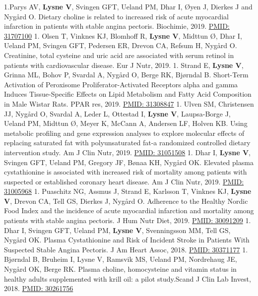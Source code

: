 \documentclass[11pt, a4paper]{awesome-cv}
\begin{document}
1.Parys AV, \textbf{Lysne V}, Svingen GFT, Ueland PM, Dhar I, Øyen J, Dierkes J and Nygård O. Dietary choline is related to increased risk of acute myocardial infarction in patients with stable angina pectoris. Biochimie, 2019. \href{https://www.ncbi.nlm.nih.gov/pubmed/31707100}{PMID: 31707100}
1. Olsen T, Vinknes KJ, Blomhoff R, \textbf{Lysne V}, Midttun Ø, Dhar I, Ueland PM, Svingen GFT, Pedersen ER, Drevon CA, Refsum H, Nygård O. Creatinine, total cysteine and uric acid are associated with serum retinol in patients with cardiovascular disease. Eur J Nutr, 2019.
1. Strand E, \textbf{Lysne V}, Grinna ML, Bohov P, Svardal A, Nygård O, Berge RK, Bjørndal B. Short-Term Activation of Peroxisome Proliferator-Activated Receptors alpha and gamma Induces Tissue-Specific Effects on Lipid Metabolism and Fatty Acid Composition in Male Wistar Rats. PPAR res, 2019. \href{https://www.ncbi.nlm.nih.gov/pubmed/31308847}{PMID: 31308847}
1. Ulven SM, Christensen JJ, Nygård O, Svardal A, Leder L, Ottestad I, \textbf{Lysne V}, Laupsa-Borge J, Ueland PM, Midttun Ø, Meyer K, McCann A, Andersen LF, Holven KB. Using metabolic profiling and gene expression analyses to explore molecular effects of replacing saturated fat with polyunsaturated fat-a randomized controlled dietary intervention study. Am J Clin Nutr, 2019. \href{https://www.ncbi.nlm.nih.gov/pubmed/31051508}{PMID: 31051508}
1. Dhar I, \textbf{Lysne V}, Svingen GFT, Ueland PM, Gregory JF, Bønaa KH, Nygård OK. Elevated plasma cystathionine is associated with increased risk of mortality among patients with suspected or established coronary heart disease. Am J Clin Nutr, 2019. \href{https://www.ncbi.nlm.nih.gov/pubmed/31005968}{PMID: 31005968}
1. Puaschitz NG, Assmus J, Strand E, Karlsson T, Vinknes KJ, \textbf{Lysne V}, Drevon CA, Tell GS, Dierkes J, Nygård O. Adherence to the Healthy Nordic Food Index and the incidence of acute myocardial infarction and mortality among patients with stable angina pectoris. J Hum Nutr Diet, 2019. \href{https://www.ncbi.nlm.nih.gov/pubmed/30091209}{PMID: 30091209}
1. Dhar I, Svingen GFT, Ueland PM, \textbf{Lysne V}, Svenningsson MM, Tell GS, Nygård OK. Plasma Cystathionine and Risk of Incident Stroke in Patients With Suspected Stable Angina Pectoris. J Am Heart Assoc, 2018. \href{https://www.ncbi.nlm.nih.gov/pubmed/30371177}{PMID: 30371177}
1. Bjørndal B, Bruheim I, Lysne V, Ramsvik MS, Ueland PM, Nordrehaug JE, Nygård OK, Berge RK. Plasma choline, homocysteine and vitamin status in healthy adults supplemented with krill oil: a pilot study.Scand J Clin Lab Invest, 2018. \href{https://www.ncbi.nlm.nih.gov/pubmed/30261756}{PMID: 30261756}
\end{document}
